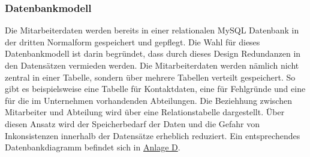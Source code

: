     \subsubsection{Datenbankmodell}
        Die Mitarbeiterdaten werden bereits in einer relationalen MySQL Datenbank in der dritten Normalform gespeichert und gepflegt. Die Wahl für dieses Datenbankmodell ist darin begründet, dass durch dieses Design Redundanzen in den Datensätzen vermieden werden. Die Mitarbeiterdaten werden nämlich nicht zentral in einer Tabelle, sondern über mehrere Tabellen verteilt gespeichert. So gibt es beispielsweise eine Tabelle für Kontaktdaten, eine für Fehlgründe und eine für die im Unternehmen vorhandenden Abteilungen. Die Beziehhung zwischen Mitarbeiter und Abteilung wird über eine Relationstabelle dargestellt. Über diesen Ansatz wird der Speicherbedarf der Daten und die Gefahr von Inkonsistenzen innerhalb der Datensätze erheblich reduziert. Ein entsprechendes Datenbankdiagramm befindet sich in \hyperref[anlage:erd]{Anlage D}.

